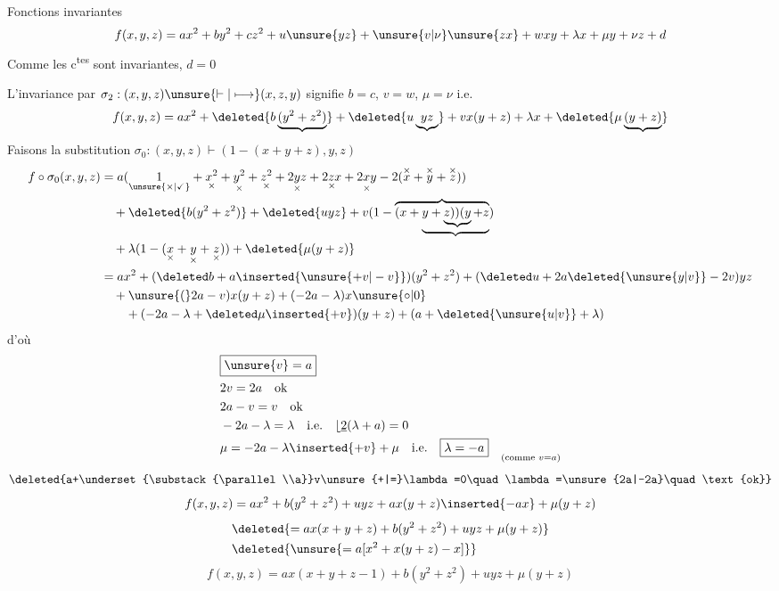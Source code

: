 Fonctions  invariantes
\[
f(x,y,z)=ax^2+by^2+cz^2+u\unsure{yz}+\unsure{v|\nu}\unsure{zx}+wxy+\lambda x+\mu y+\nu z+d
\]
Comme les c\textsuperscript{tes} sont invariantes,  $d=0$

L'invariance par $\sigma_2:(x,y,z)\unsure{\vdash|\longmapsto}(x,z,y)$ signifie $b=c$, $v=w$, $\mu=\nu$ i.e.
\[
f(x,y,z)=ax^2+\deleted{b\underbrace{(y^2+z^2)}}+\deleted{u\underbrace{yz}}+vx(y+z)+\lambda x+\deleted{\mu\underbrace{(y+z)}}
\]
Faisons la substitution $\sigma_0:(x,y,z)\vdash(1-(x+y+z),y,z)$
\[
\begin{aligned}
f\circ\sigma_0(x,y,z)
&=a(\underset{\unsure{\times|\checkmark}}1+\underset{\times}{x^2}+\underset{\times}{y^2}+\underset{\times}{z^2}+\underset{\times}{2yz}+\underset{\times}{2zx}+\underset{\times}{2xy}-2(\overset{\times}x+\overset{\times}y+\overset{\times}z))\\
&\quad+\deleted{b(y^2+z^2)}+\deleted{uyz}+v(1-\overbrace{(x+\underbrace{y+\underbrace{z))(y}+z}})\\
&\quad+\lambda(1-(\underset{\times}x+\underset{\times}y+\underset{\times}z))+\deleted{\mu(y+z)}\\
&=ax^2+(\deleted b+a\inserted{\unsure{+v|-v}})(y^2+z^2)+(\deleted u+2a\deleted{\unsure{y|v}}-2v)yz\\
&\quad+\unsure{(}2a-v)x(y+z)+(-2a-\lambda)x\unsure{\circ|0}\\
&\qquad+(-2a-\lambda+\deleted\mu\inserted{+v})(y+z)+(a+\deleted{\unsure{u|v}}+\lambda)
\end{aligned}
\]
d'où
\[
\begin{aligned}
&\boxed{\unsure{v}=a}\\
&2v=2a\quad\text{ok}\\
&2a-v=v\quad\text{ok}\\
&-2a-\lambda=\lambda\quad\text{i.e.}\quad\lfloor\underline{2}(\lambda+a)=0\\
&\mu=-2a-\lambda\inserted{+v}+\mu\quad\text{i.e.}\quad\boxed{\lambda=-a}\quad\underset{\text{(comme }v=a\text{)}}{}
\end{aligned}
\]
\[
\deleted{a+\underset{\substack{\parallel\\a}}v\unsure{+|=}\lambda=0\quad\lambda=\unsure{2a|-2a}\quad\text{ok}}
\]
\[
f(x,y,z)=ax^2+b(y^2+z^2)+uyz+ax(y+z)\inserted{-ax}+\mu(y+z)
\]
\[
\begin{aligned}
&\deleted{=ax(x+y+z)+b(y^2+z^2)+uyz+\mu(y+z)}\\
&\deleted{\unsure{=a[x^2+x(y+z)-x]}}
\end{aligned}
\]
\[
f(x,y,z)=ax(x+y+z-1)+b(y^2+z^2)+uyz+\mu(y+z)
\]
